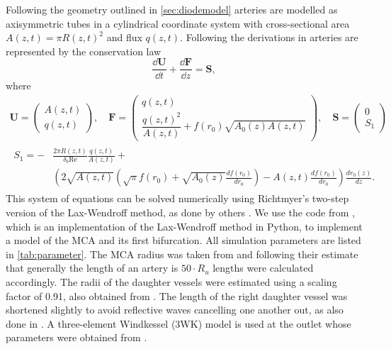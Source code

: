 \documentclass[a4paper,titlepage]{scrartcl}
\begin{document}
Following the geometry outlined in \autoref{sec:diodemodel} arteries are modelled as axisymmetric tubes in a cylindrical coordinate system with cross-sectional area $A(z,t) = \pi R(z,t)^2$ and flux $q(z,t)$. Following the derivations in \cite{Olufsen2000,Diem2016} arteries are represented by the conservation law
\begin{equation}
  \frac{\dd \boldsymbol{U}}{\dd t} + \frac{\dd \boldsymbol{F}}{\dd z} = \boldsymbol{S}, \label{eq:conservation}
\end{equation}
where
\begin{gather*}
  \boldsymbol{U} = \begin{pmatrix} A(z,t) \\ q(z,t) \end{pmatrix}, \quad \boldsymbol{F} = \begin{pmatrix} q(z,t)\\ \dfrac{q(z,t)^2}{A(z,t)} + f(r_0) \sqrt{A_0(z) A(z,t)} \end{pmatrix}, \quad \boldsymbol{S} = \begin{pmatrix} 0\\ S_1 \end{pmatrix}\\
  \begin{split}
    S_1 = -&\frac{2 \pi R(z,t)}{\delta_b \mathrm{Re}} \frac{q(z,t)}{A(z,t)} +\\
    &\left( 2 \sqrt{A(z,t)} \left( \sqrt{\pi} f(r_0) + \sqrt{A_0(z)} \frac{df(r_0)}{dr_0 } \right) - A(z,t) \frac{df(r_0)}{dr_0} \right) \frac{dr_0(z)}{dz}.
  \end{split}
\end{gather*}
This system of equations can be solved numerically using Richtmyer's two-step version of the Lax-Wendroff method, as done by others \cite{Olufsen2000,LeVeque1992,Kolachalama2007}. We use the code from \cite{Diem2016a}, which is an implementation of the Lax-Wendroff method in Python, to implement a model of the MCA and its first bifurcation. All simulation parameters are listed in \autoref{tab:parameter}. The MCA radius was taken from \cite{Cousins2014} and following their estimate that generally the length of an artery is $50 \cdot R_u$ lengths were calculated accordingly. The radii of the daughter vessels were estimated using a scaling factor of 0.91, also obtained from \cite{Cousins2014}. The length of the right daughter vessel was shortened slightly to avoid reflective waves cancelling one another out, as also done in \cite{Kolachalama2007}. A three-element Windkessel (3WK) model is used at the outlet whose parameters were obtained from \cite{Olufsen2002}.
\end{document}
